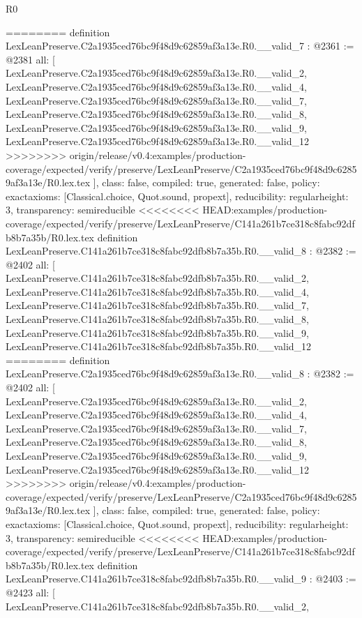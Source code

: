 \begin{lexlean}{R0}
\begin{coremodule}
{{{{{{{{{{{{{{{{{{{{{{{{{{{{{{{{{{{{{{{{{{{{{{========
definition LexLeanPreserve.C2a1935ced76bc9f48d9c62859af3a13e.R0.__valid_7 : @2361 := @2381 {
  all: [
    LexLeanPreserve.C2a1935ced76bc9f48d9c62859af3a13e.R0.__valid_2,
    LexLeanPreserve.C2a1935ced76bc9f48d9c62859af3a13e.R0.__valid_4,
    LexLeanPreserve.C2a1935ced76bc9f48d9c62859af3a13e.R0.__valid_7,
    LexLeanPreserve.C2a1935ced76bc9f48d9c62859af3a13e.R0.__valid_8,
    LexLeanPreserve.C2a1935ced76bc9f48d9c62859af3a13e.R0.__valid_9,
    LexLeanPreserve.C2a1935ced76bc9f48d9c62859af3a13e.R0.__valid_12
>>>>>>>> origin/release/v0.4:examples/production-coverage/expected/verify/preserve/LexLeanPreserve/C2a1935ced76bc9f48d9c62859af3a13e/R0.lex.tex
  ],
  class: false,
  compiled: true,
  generated: false,
  policy: exact{axioms: [Classical.choice, Quot.sound, propext]},
  reducibility: regular{height: 3},
  transparency: semireducible
}
<<<<<<<< HEAD:examples/production-coverage/expected/verify/preserve/LexLeanPreserve/C141a261b7ce318c8fabc92dfb8b7a35b/R0.lex.tex
definition LexLeanPreserve.C141a261b7ce318c8fabc92dfb8b7a35b.R0.__valid_8 : @2382 := @2402 {
  all: [
    LexLeanPreserve.C141a261b7ce318c8fabc92dfb8b7a35b.R0.__valid_2,
    LexLeanPreserve.C141a261b7ce318c8fabc92dfb8b7a35b.R0.__valid_4,
    LexLeanPreserve.C141a261b7ce318c8fabc92dfb8b7a35b.R0.__valid_7,
    LexLeanPreserve.C141a261b7ce318c8fabc92dfb8b7a35b.R0.__valid_8,
    LexLeanPreserve.C141a261b7ce318c8fabc92dfb8b7a35b.R0.__valid_9,
    LexLeanPreserve.C141a261b7ce318c8fabc92dfb8b7a35b.R0.__valid_12
========
definition LexLeanPreserve.C2a1935ced76bc9f48d9c62859af3a13e.R0.__valid_8 : @2382 := @2402 {
  all: [
    LexLeanPreserve.C2a1935ced76bc9f48d9c62859af3a13e.R0.__valid_2,
    LexLeanPreserve.C2a1935ced76bc9f48d9c62859af3a13e.R0.__valid_4,
    LexLeanPreserve.C2a1935ced76bc9f48d9c62859af3a13e.R0.__valid_7,
    LexLeanPreserve.C2a1935ced76bc9f48d9c62859af3a13e.R0.__valid_8,
    LexLeanPreserve.C2a1935ced76bc9f48d9c62859af3a13e.R0.__valid_9,
    LexLeanPreserve.C2a1935ced76bc9f48d9c62859af3a13e.R0.__valid_12
>>>>>>>> origin/release/v0.4:examples/production-coverage/expected/verify/preserve/LexLeanPreserve/C2a1935ced76bc9f48d9c62859af3a13e/R0.lex.tex
  ],
  class: false,
  compiled: true,
  generated: false,
  policy: exact{axioms: [Classical.choice, Quot.sound, propext]},
  reducibility: regular{height: 3},
  transparency: semireducible
}
<<<<<<<< HEAD:examples/production-coverage/expected/verify/preserve/LexLeanPreserve/C141a261b7ce318c8fabc92dfb8b7a35b/R0.lex.tex
definition LexLeanPreserve.C141a261b7ce318c8fabc92dfb8b7a35b.R0.__valid_9 : @2403 := @2423 {
  all: [
    LexLeanPreserve.C141a261b7ce318c8fabc92dfb8b7a35b.R0.__valid_2,
}}}}}}}}}}}}}}}}}}}}}}}}}}}}}}}}}}}}}}}}}}}}}}}}
\end{coremodule}
\end{lexlean}
